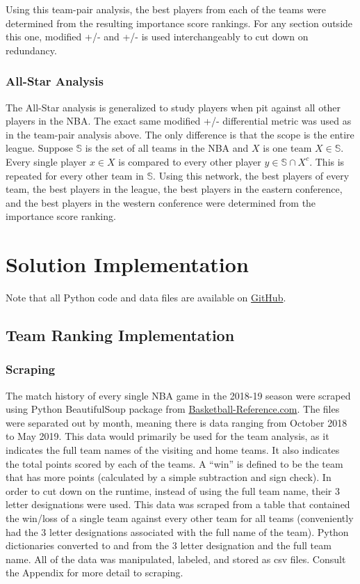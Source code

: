 \documentclass[12pt]{article}%
\begin{document}
Using this team-pair analysis, the best players from each of the teams were determined from the resulting importance score rankings. For any section outside this one, modified +/- and +/- is used interchangeably to cut down on redundancy.
\subsubsection{All-Star Analysis}
\label{sec:2.3}
\null\quad\quad The All-Star analysis is generalized to study players when pit against all other players in the NBA. The exact same modified +/- differential metric was used as in the team-pair analysis above. The only difference is that the scope is the entire league. Suppose $\mathbb S$ is the set of all teams in the NBA and $X$ is one team $X\in\mathbb S$. Every single player $x\in X$ is compared to every other player $y\in \mathbb S\cap X^c$. This is repeated for every other team in $\mathbb S$. Using this network, the best players of every team, the best players in the league, the best players in the eastern conference, and the best players in the western conference were determined from the importance score ranking.
\section{Solution Implementation}
\label{implementation}
Note that all Python code and data files are available on \href{https://github.com/dchaebae/NBAPredictions}{GitHub}.
\subsection{Team Ranking Implementation}
\label{teamimp}
\subsubsection{Scraping}
\label{teamimp_scraping}
\null\quad\quad The match history of every single NBA game in the 2018-19 season were scraped using Python BeautifulSoup package from \href{https://www.basketball-reference.com/}{Basketball-Reference.com}. The files were separated out by month, meaning there is data ranging from October 2018 to May 2019. This data would primarily be used for the team analysis, as it indicates the full team names of the visiting and home teams. It also indicates the total points scored by each of the teams. A ``win'' is defined to be the team that has more points (calculated by a simple subtraction and sign check). In order to cut down on the runtime, instead of using the full team name, their 3 letter designations were used. This data was scraped from a table that contained the win/loss of a single team against every other team for all teams (conveniently had the 3 letter designations associated with the full name of the team). Python dictionaries converted to and from the 3 letter designation and the full team name. All of the data was manipulated, labeled, and stored as csv files. Consult the Appendix for more detail to scraping.
\end{document}
